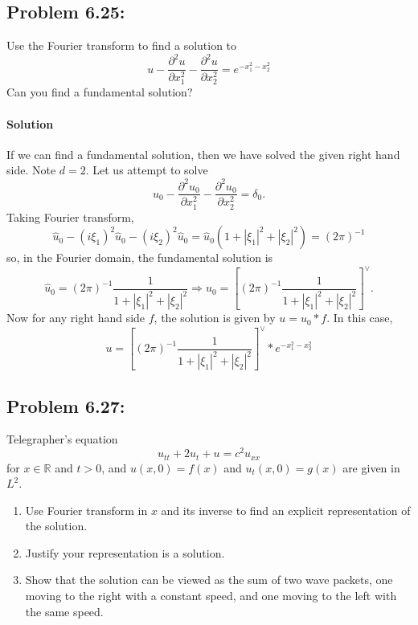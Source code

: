 \documentclass[letterpaper,twoside,11pt]{article}
\theoremstyle{mystyle}
\newcommand{\R}{{\mathbb R}}
\newcommand{\cred}{\color{red}}
\begin{document}
\subsection*{Problem 6.25:} 
Use the Fourier transform to find a solution to 
\[u - \frac{\partial^2 u }{\partial x_1^2 } - \frac{\partial^2 u }{\partial x_2^2 } = e^{-x_1^2 - x_2^2 } \] 
Can you find a fundamental solution? 

\paragraph*{Solution} If we can find a fundamental solution, then we have solved the given right hand side. Note $d=2$. Let us attempt to solve 
\[u_0 - \frac{{{\partial ^2}u_0}}{{\partial x_1^2}} - \frac{{{\partial ^2}u_0}}{{\partial x_2^2}} = {\delta _0}.\] 
Taking Fourier transform, 
\[\hat u_0 - {\left( {i{\xi _1}} \right)^2}\hat u_0 - {\left( {i{\xi _2}} \right)^2}\hat u_0 = \hat u_0\left( {1 + {{\left| {{\xi _1}} \right|}^2} + {{\left| {{\xi _2}} \right|}^2}} \right) = {\left( {2\pi } \right)^{ - 1}}\]
so, in the Fourier domain, the fundamental solution is 
\[\hat u_0 = {\left( {2\pi } \right)^{ - 1}}\frac{1}{{1 + {{\left| {{\xi _1}} \right|}^2} + {{\left| {{\xi _2}} \right|}^2}}} \Rightarrow {{ u}_0} = {\left[ {{{\left( {2\pi } \right)}^{ - 1}}\frac{1}{{1 + {{\left| {{\xi _1}} \right|}^2} + {{\left| {{\xi _2}} \right|}^2}}}} \right]^ \vee }.\]
Now for any right hand side $f$, the solution is given by $u = u_0 \ast f$. In this case, 
\[u = {\left[ {{{\left( {2\pi } \right)}^{ - 1}}\frac{1}{{1 + {{\left| {{\xi _1}} \right|}^2} + {{\left| {{\xi _2}} \right|}^2}}}} \right]^ \vee } * {e^{ - x_1^2 - x_2^2}}\]







\cred 
\subsection*{Problem 6.27:}
Telegrapher's equation 
\[u_{tt} + 2u_t + u = c^2 u_{xx} \]
for $x \in \R$ and $t>0$, and $u(x, 0) = f(x)$ and $u_t(x, 0) = g(x)$ are given in $L^2$. 
\begin{enumerate}
  \item Use Fourier transform in $x$ and its inverse to find an explicit representation of the solution. 
  \item Justify your representation is a solution. 
  \item Show that the solution can be viewed as the sum of two wave packets, one moving to the right with a constant speed, and one moving to the left with the same speed. 
\end{enumerate}
\end{document}
